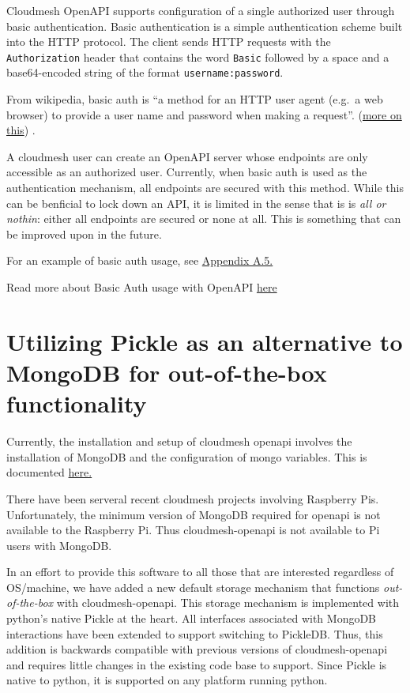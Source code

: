 Cloudmesh OpenAPI supports configuration of a single authorized user
through basic authentication. Basic authentication is a simple
authentication scheme built into the HTTP protocol. The client sends
HTTP requests with the \verb|Authorization| header that contains the
word \verb|Basic| followed by a space and a base64-encoded string of
the format \verb|username:password|.

From wikipedia, basic auth is ``a method for an HTTP user agent (e.g.~a
web browser) to provide a user name and password when making a
request''. (\href{https://github.com/cloudmesh/cloudmesh-openapi}{more
on this}) \cite{cloudmesh-openapi}.

A cloudmesh user can create an OpenAPI server whose endpoints are only
accessible as an authorized user. Currently, when basic auth is used as
the authentication mechanism, all endpoints are secured with this
method. While this can be benficial to lock down an API, it is limited
in the sense that is is {\em all or nothin}: either all endpoints are
secured or none at all. This is something that can be improved upon in
the future.

For an example of basic auth usage, see
\protect\hyperlink{a5-basic-auth-example}{Appendix A.5.}

Read more about Basic Auth usage with OpenAPI
\href{https://swagger.io/docs/specification/authentication/basic-authentication/}{here}

\section{Utilizing Pickle as an alternative to MongoDB for
  out-of-the-box
  functionality}\label{utilizing-pickle-as-an-alternative-to-mongodb-for-out-of-the-box-functionality}

Currently, the installation and setup of cloudmesh openapi involves the
installation of MongoDB and the configuration of mongo variables. This
is documented
\href{https://github.com/cloudmesh/cloudmesh-openapi\#installation}{here.}

There have been serveral recent cloudmesh projects involving Raspberry
Pis. Unfortunately, the minimum version of MongoDB required for openapi
is not available to the Raspberry Pi. Thus cloudmesh-openapi is not
available to Pi users with MongoDB.

In an effort to provide this software to all those that are interested
regardless of OS/machine, we have added a new default storage mechanism
that functions {\em out-of-the-box} with cloudmesh-openapi. This storage
mechanism is implemented with python's native Pickle at the heart. All
interfaces associated with MongoDB interactions have been extended to
support switching to PickleDB. Thus, this addition is backwards
compatible with previous versions of cloudmesh-openapi and requires
little changes in the existing code base to support. Since Pickle is
native to python, it is supported on any platform running python.

